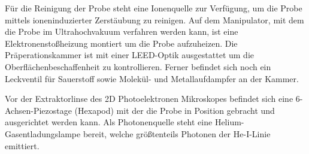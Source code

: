         Für die Reinigung der Probe steht eine Ionenquelle zur Verfügung, um die Probe mittels ioneninduzierter Zerstäubung zu reinigen.
        Auf dem Manipulator, mit dem die Probe im Ultrahochvakuum verfahren werden kann, ist eine Elektronenstoßheizung montiert um die Probe aufzuheizen.
        Die Präperationskammer ist mit einer LEED-Optik ausgestattet um die Oberflächenbeschaffenheit zu kontrollieren.
        Ferner befindet sich noch ein Leckventil für Sauerstoff sowie Molekül- und Metallaufdampfer an der Kammer.
        
        Vor der Extraktorlinse des 2D Photoelektronen Mikroskopes befindet sich eine 6-Achsen-Piezostage (Hexapod) mit der die Probe in Position gebracht und ausgerichtet werden kann.
        Als Photonenquelle steht eine Helium-Gasentladungslampe bereit, welche größtenteils Photonen der He-I-Linie emittiert.